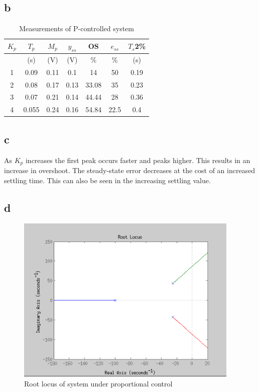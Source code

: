 \documentclass{article}
\begin{document}
\subsection*{b} %
\begin{table}[!htbp]
\centering
    \begin{tabular}{|c|c|c|c|c|c|c|}
        \hline
        $K_p$ & $T_p$ & $M_p$ & $y_{ss}$ & OS & $e_{ss}$ & $T_s$2\% \\
        \hline
        & (s) & (V) & (V) & \% & \% & (s) \\
        \hline
        1 & 0.09 & 0.11 & 0.1 & 14 & 50 & 0.19\\
        \hline
        2 & 0.08 & 0.17 & 0.13 & 33.08 & 35 & 0.23\\
        \hline
        3 & 0.07 & 0.21 & 0.14 & 44.44 & 28 & 0.36\\
        \hline
        4 & 0.055 & 0.24 & 0.16 & 54.84 & 22.5 & 0.4\\
        \hline
    \end{tabular}
    \caption{Measurements of P-controlled system}
\end{table}

\subsection*{c} %
As $K_p$ increases the first peak occurs faster and peaks higher. This results in an increase in overshoot. The steady-state error decreases at the cost of an increased settling time. This can also be seen in the increasing settling value.

\subsection*{d} %
\begin{figure}[!htbp]
    \centering
    \includegraphics[width=0.95\textwidth]{5_2_locus.png}
    \caption{Root locus of system under proportional control}
\end{figure}
\end{document}
